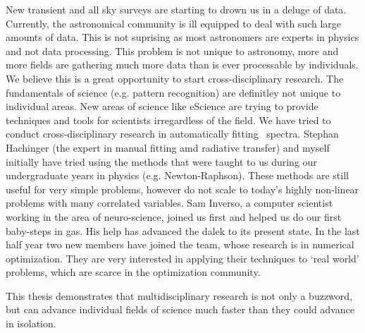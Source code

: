 New transient and all sky surveys are starting to drown us in a deluge of data. Currently, the astronomical community is ill equipped to deal with such large amounts of data. This is not suprising as most astronomers are experts in physics and not data processing. This problem is not unique to astronomy, more and more fields are gathering much more data than is ever processable by individuals. We believe this is a great opportunity to start cross-disciplinary research. The fundamentals of science (e.g. pattern recognition) are definitley not unique to individual areas. New areas of science like eScience are trying to provide techniques and tools for scientists irregardless of the field. 
We have tried to conduct cross-disciplinary research in automatically fitting \sneia\ spectra. Stephan Hachinger (the expert in manual fitting amd radiative transfer) and myself initially have tried using the methods that were taught to us during our undergraduate years in physics (e.g. Newton-Raphson). These methods are still useful for very simple problems, however do not scale to today's highly non-linear problems with many correlated variables. Sam Inverso, a computer scientist working in the area of neuro-science, joined us first and helped us do our first baby-steps in \glspl{ga}. His help has advanced the \gls{dalek} to its present state. In the last half year two new members have joined the team, whose research is in numerical optimization. They are very interested in applying their techniques to `real world' problems, which are scarce in the optimization community.

This thesis demonstrates that multidisciplinary research is not only a buzzword, but can advance individual fields of science much faster than they could advance in isolation.


